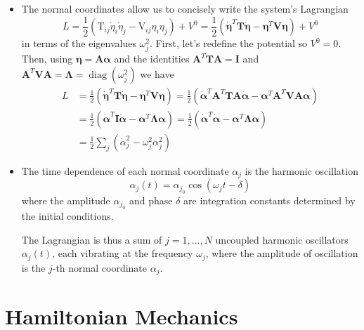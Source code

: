 \documentclass[11pt, a4paper]{article}
\newcommand{\bdot}[1]{\dot{\bm{#1}}}
\newcommand{\mat}[1]{\mathbf{#1}}
\begin{document}
\begin{itemize}
	\item The normal coordinates allow us to concisely write the system's Lagrangian
	\begin{equation*}
		L = \frac{1}{2} \left( \mathrm{T}_{ij}\dot{\eta}_{i}\dot{\eta}_{j} - \mathrm{V}_{ij}\eta_{i}\eta_{j} \right) + V^{0} =  \frac{1}{2}\left(\bdot{\eta}^{T} \mat{T} \bdot{\eta} - \bm{\eta}^{T} \mat{V} \bm{\eta}\right) + V^{0}
	\end{equation*}
	in terms of the eigenvalues $ \omega_{j}^{2} $. First, let's redefine the potential so $ V^{0} = 0$. Then, using $ \bm{\eta} = \mat{A} \bm{\alpha}  $ and the identities $ \mat{A}^{T} \mat{T} \mat{A} = \mat{I} $ and $  \mat{A}^{T} \mat{V} \mat{A} = \mat{\Lambda} = \operatorname{diag}(\omega_{j}^{2}) $ we have
	\begin{align*}
		L &= \frac{1}{2}\left(\bdot{\eta}^{T} \mat{T} \bdot{\eta} - \bm{\eta}^{T} \mat{V} \bm{\eta}\right) = \frac{1}{2} \left( \bdot{\alpha}^{T} \mat{A}^{T} \mat{T} \mat{A} \bdot{\alpha} - \bm{\alpha}^{T} \mat{A}^{T} \mat{V} \mat{A} \bm{\alpha} \right)\\
		&=\frac{1}{2}\left(\bdot{\alpha}^{T} \mat{I} \bdot{\alpha} - \bm{\alpha}^{T} \mat{\Lambda} \bm{\alpha}\right) =\frac{1}{2}\left(\bdot{\alpha}^{T} \bdot{\alpha} - \bm{\alpha}^{T} \mat{\Lambda} \bm{\alpha}\right)\\
		&=\frac{1}{2}\sum_{j}\left(\dot{\alpha}_{j}^{2} - \omega_{j}^{2} \alpha_{j}^{2} \right)
	\end{align*}
	
	\item The time dependence of each normal coordinate $ \alpha_{j} $ is the harmonic oscillation
	\begin{equation*}
		\alpha_{j}(t) = \alpha_{j_{0}} \cos(\omega_{j}t - \delta)
	\end{equation*}
	where the amplitude $ \alpha_{j_{0}} $ and phase $ \delta $ are integration constants determined by the initial conditions.
	
	The Lagrangian is thus a sum of $ j = 1, \ldots, N$ uncoupled harmonic oscillators $ \alpha_{j}(t) $, each vibrating at the frequency $ \omega_{j} $, where the amplitude of oscillation is the $ j $-th normal coordinate $ \alpha_{j} $. 
	

\end{itemize}

\newpage

\section{Hamiltonian Mechanics}
\end{document}
